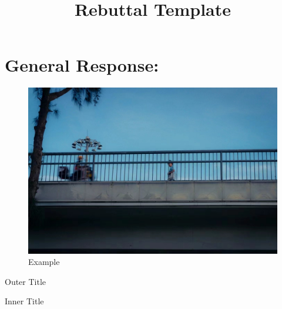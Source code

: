 \documentclass[11pt]{article}
\title{Rebuttal Template}
\date{}
\begin{document}
\maketitle
\onehalfspacing
\renewcommand{\thereviewerSection}{G}
\section{General Response:}

\lipsum[1]\cite{jiang2023detecting}

\reviewercomment{\lipsum[2]}\label{comm:g.1}



\reviewercomment{\lipsum[2]}\label{comm:1.1}

\begin{response}
\lipsum[3]
\end{response}


\reviewercomment{\lipsum[5]}


\begin{figure}[h]
    \centering
    \includegraphics[width=1\linewidth]{figures/example.jpeg}
    \caption{Example}
    \label{fig:example}
\end{figure}
\begin{response}

    \lipsum[6]
\end{response}

\begin{manuscriptchangeenv}{Outer Title}
    \lipsum[7]
    \begin{manuscriptchangeenv}{Inner Title}
        \lipsum[8]
    \end{manuscriptchangeenv}
\end{manuscriptchangeenv}
\end{document}
